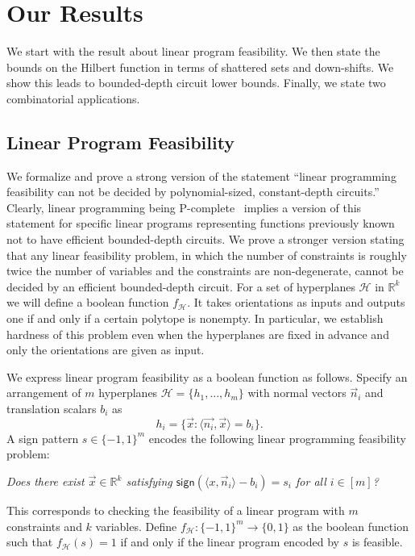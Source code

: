 \documentclass[11pt]{article}
\theoremstyle{definition}
\newcommand{\1}{\mathbf{1}}
\newcommand{\R}{{\mathbb R}}
\newcommand{\sign}{\mathsf{sign}}
\begin{document}

\section{Our Results}  \label{section:results}

We start with the result about linear program feasibility.  We then state the bounds on the Hilbert function in terms of shattered sets and down-shifts.  We show this leads to bounded-depth circuit lower bounds.  Finally, we state two combinatorial applications. 
\subsection{Linear Program Feasibility}\label{sec:result_lp}

We formalize and prove a strong version of the statement ``linear programming feasibility can not be decided by polynomial-sized, constant-depth circuits.''  Clearly, linear programming being P-complete~\cite{dobkin} implies a version of this statement for specific linear programs representing functions previously known not to have efficient bounded-depth circuits.  
We prove a stronger version stating that any linear feasibility problem, in which the number of constraints is roughly twice the number of variables and the constraints are non-degenerate, cannot be decided by an efficient bounded-depth circuit.   
For a set of hyperplanes $\mathcal{H}$ in $\R^k$ we will define a boolean function $f_\mathcal{H}$.  It takes orientations as inputs and outputs one if and only if a certain polytope is nonempty.  In particular, we establish hardness of this problem even when the hyperplanes are fixed in advance and only the orientations are given as input.   

We express linear program feasibility as a boolean function as follows.
Specify an arrangement of $m$ hyperplanes $\mathcal{H}=\{h_1,\ldots,h_m\}$ with normal vectors $\vec n_i$ and translation scalars $b_i$ as 
$$h_i=\{\vec{x}:\langle\vec{n_i},\vec{x}\rangle=b_i\}.$$
\noindent
A sign pattern $s\in\{- 1,1\}^m$ encodes the following linear programming feasibility problem:   
\begin{center}
{\em Does there exist $\vec x\in\R^k$ satisfying $\sign(\langle x, \vec n_i\rangle - b_i) = s_i$ for all $i \in [m]$?}
\end{center}

This corresponds to checking the feasibility of a linear program with $m$ constraints and $k$ variables.  Define $f_\mathcal{H}:\{- 1,1\}^m\rightarrow\{0,1\}$ as the boolean function such that $f_\mathcal{H}(s)=1$ if and only if the linear program encoded by $s$ is feasible.
\end{document}
